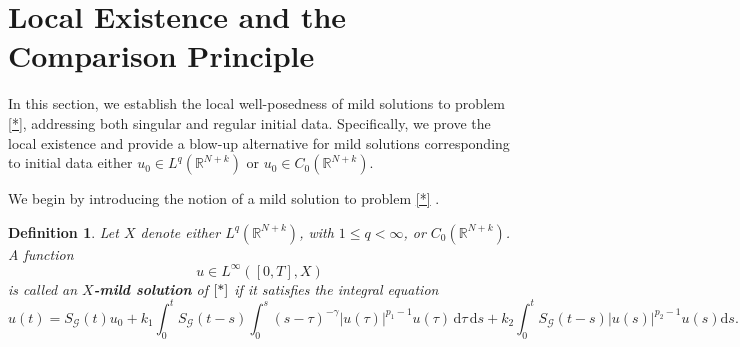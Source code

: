 \documentclass[a4,psfig,english,12pt,epsf,portrait]{article}
\newtheorem{definition}{Definition}[section]
\newtheorem{lemma}[theorem]{Lemma}
\numberwithin{equation}{section}
\def\R{{\mathbb {R}}}
\newcommand{\abs}[1]{\lvert#1\rvert}
\def\R{\mathbb{R}}
\begin{document}
%


\section{Local Existence and the Comparison Principle}\label{local}


In this section, we establish the local well-posedness of mild solutions to problem \eqref{*}, addressing both singular and regular initial data. Specifically, we prove the local existence and provide a blow-up alternative for mild solutions corresponding to initial data either $u_0 \in L^q(\R^{N+k})$ or $u_0\in C_0(\mathbb{R}^{N+k})$.%

We begin by introducing the notion of a mild solution to problem \eqref{*} .
\begin{definition} Let $X$ denote either $L^q(\mathbb{R}^{N+k})$, with $1\leq q< \infty$, or $C_0(\mathbb{R}^{N+k})$. A function
	$$u\in L^\infty([0,T],X)$$ 
	is called an {\bf $X$-mild solution} of $\eqref{*}$ if it satisfies the integral equation
	\begin{equation}\label{branda}
		u(t)=S_{\mathcal{G}}(t)u_0 + k_1 \int_{0}^{t}S_{\mathcal{G}}(t-s) \int_0^s(s-\tau)^{-\gamma}\abs{u(\tau)}^{p_1-1}u(\tau) \, \mathrm{d}\tau \,\mathrm{d}s + k_2\int_{0}^{t}S_{\mathcal{G}}(t-s) |u(s)|^{p_2-1}u(s)\mathrm{d}s.
	\end{equation}
\end{definition}
\end{document}
